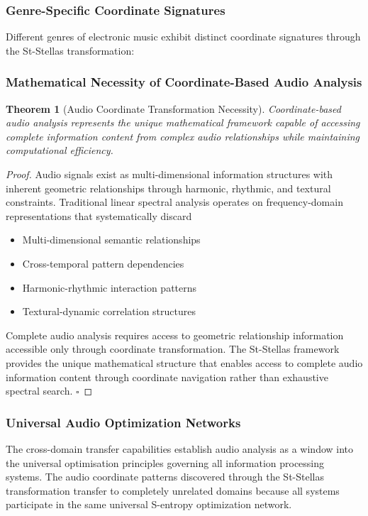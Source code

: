 \documentclass[12pt,a4paper]{article}
\newtheorem{theorem}{Theorem}
\begin{document}
\subsubsection{Genre-Specific Coordinate Signatures}

Different genres of electronic music exhibit distinct coordinate signatures through the St-Stellas transformation:

\subsubsection{Mathematical Necessity of Coordinate-Based Audio Analysis}

\begin{theorem}[Audio Coordinate Transformation Necessity]
Coordinate-based audio analysis represents the unique mathematical framework capable of accessing complete information content from complex audio relationships while maintaining computational efficiency.
\end{theorem}

\begin{proof}
Audio signals exist as multi-dimensional information structures with inherent geometric relationships through harmonic, rhythmic, and textural constraints. Traditional linear spectral analysis operates on frequency-domain representations that systematically discard
\begin{itemize}
\item Multi-dimensional semantic relationships
\item Cross-temporal pattern dependencies
\item Harmonic-rhythmic interaction patterns
\item Textural-dynamic correlation structures
\end{itemize}

Complete audio analysis requires access to geometric relationship information accessible only through coordinate transformation. The St-Stellas framework provides the unique mathematical structure that enables access to complete audio information content through coordinate navigation rather than exhaustive spectral search. $\square$
\end{proof}

\subsubsection{Universal Audio Optimization Networks}

The cross-domain transfer capabilities establish audio analysis as a window into the universal optimisation principles governing all information processing systems. The audio coordinate patterns discovered through the St-Stellas transformation transfer to completely unrelated domains because all systems participate in the same universal S-entropy optimization network.
\end{document}
